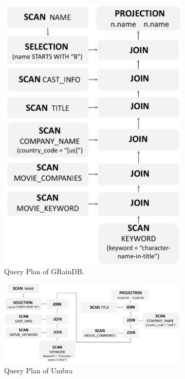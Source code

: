 \begin{figure}[ht]
\begin{subfigure}[b]{.5\linewidth}
        \includegraphics[width=.9\linewidth]{./figures/job17a-plan-graindb.pdf}
        \caption{Query Plan of GRainDB.}
        \label{fig:job17a-plan-graindb}
    \end{subfigure}
    \begin{subfigure}[b]{\linewidth}
        \centering
        \includegraphics[width=\linewidth]{./figures/job17a-plan-umbra.pdf}
        \caption{Query Plan of Umbra}
        \label{fig:job17a-plan-umbra}
    \end{subfigure}
    \caption{}
    \label{fig:job17a-query-plans}
\end{figure}


